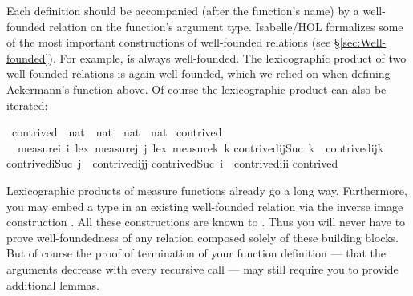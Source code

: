 \begin{isabellebody}
\begin{isamarkuptext}
Each  definition should be accompanied (after the function's
name) by a well-founded relation on the function's argument type.  
Isabelle/HOL formalizes some of the most important
constructions of well-founded relations (see \S\ref{sec:Well-founded}). For
example,  is always well-founded.   The lexicographic
product of two well-founded relations is again well-founded, which we relied
on when defining Ackermann's function above.
Of course the lexicographic product can also be iterated:%
\end{isamarkuptext}%
\isamarkuptrue%
\isamarkupfalse%
\ contrived\ {\isacharcolon}{\isacharcolon}\ {\isachardoublequoteopen}nat\ {\isasymtimes}\ nat\ {\isasymtimes}\ nat\ {\isasymRightarrow}\ nat{\isachardoublequoteclose}\isanewline
{}\isamarkupfalse%
\ contrived\isanewline
\ \ {\isachardoublequoteopen}measure{\isacharparenleft}{\isasymlambda}i{\isachardot}\ i{\isacharparenright}\ {\isacharless}{\isacharasterisk}lex{\isacharasterisk}{\isachargreater}\ measure{\isacharparenleft}{\isasymlambda}j{\isachardot}\ j{\isacharparenright}\ {\isacharless}{\isacharasterisk}lex{\isacharasterisk}{\isachargreater}\ measure{\isacharparenleft}{\isasymlambda}k{\isachardot}\ k{\isacharparenright}{\isachardoublequoteclose}\isanewline
{\isachardoublequoteopen}contrived{\isacharparenleft}i{\isacharcomma}j{\isacharcomma}Suc\ k{\isacharparenright}\ {\isacharequal}\ contrived{\isacharparenleft}i{\isacharcomma}j{\isacharcomma}k{\isacharparenright}{\isachardoublequoteclose}\isanewline
{\isachardoublequoteopen}contrived{\isacharparenleft}i{\isacharcomma}Suc\ j{\isacharcomma}{}{\isacharparenright}\ {\isacharequal}\ contrived{\isacharparenleft}i{\isacharcomma}j{\isacharcomma}j{\isacharparenright}{\isachardoublequoteclose}\isanewline
{\isachardoublequoteopen}contrived{\isacharparenleft}Suc\ i{\isacharcomma}{}{\isacharcomma}{}{\isacharparenright}\ {\isacharequal}\ contrived{\isacharparenleft}i{\isacharcomma}i{\isacharcomma}i{\isacharparenright}{\isachardoublequoteclose}\isanewline
{\isachardoublequoteopen}contrived{\isacharparenleft}{}{\isacharcomma}{}{\isacharcomma}{}{\isacharparenright}\ \ \ \ \ {\isacharequal}\ {}{\isachardoublequoteclose}%
\begin{isamarkuptext}%
Lexicographic products of measure functions already go a long
way. Furthermore, you may embed a type in an
existing well-founded relation via the inverse image construction . All these constructions are known to . Thus you
will never have to prove well-foundedness of any relation composed
solely of these building blocks. But of course the proof of
termination of your function definition --- that the arguments
decrease with every recursive call --- may still require you to provide
additional lemmas.


\end{isamarkuptext}
\end{isabellebody}
